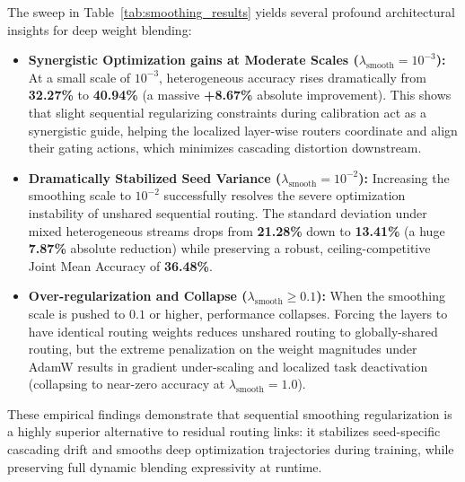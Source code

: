 The sweep in Table~\ref{tab:smoothing_results} yields several profound architectural insights for deep weight blending:
\begin{itemize}
    \item \textbf{Synergistic Optimization gains at Moderate Scales ($\lambda_{\text{smooth}} = 10^{-3}$):} At a small scale of $10^{-3}$, heterogeneous accuracy rises dramatically from \textbf{32.27\%} to \textbf{40.94\%} (a massive \textbf{+8.67\%} absolute improvement). This shows that slight sequential regularizing constraints during calibration act as a synergistic guide, helping the localized layer-wise routers coordinate and align their gating actions, which minimizes cascading distortion downstream.
    \item \textbf{Dramatically Stabilized Seed Variance ($\lambda_{\text{smooth}} = 10^{-2}$):} Increasing the smoothing scale to $10^{-2}$ successfully resolves the severe optimization instability of unshared sequential routing. The standard deviation under mixed heterogeneous streams drops from \textbf{21.28\%} down to \textbf{13.41\%} (a huge \textbf{7.87\%} absolute reduction) while preserving a robust, ceiling-competitive Joint Mean Accuracy of \textbf{36.48\%}.
    \item \textbf{Over-regularization and Collapse ($\lambda_{\text{smooth}} \ge 0.1$):} When the smoothing scale is pushed to $0.1$ or higher, performance collapses. Forcing the layers to have identical routing weights reduces unshared routing to globally-shared routing, but the extreme penalization on the weight magnitudes under AdamW results in gradient under-scaling and localized task deactivation (collapsing to near-zero accuracy at $\lambda_{\text{smooth}} = 1.0$).
\end{itemize}
These empirical findings demonstrate that sequential smoothing regularization is a highly superior alternative to residual routing links: it stabilizes seed-specific cascading drift and smooths deep optimization trajectories during training, while preserving full dynamic blending expressivity at runtime.

